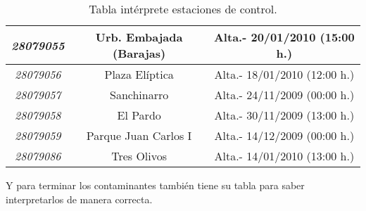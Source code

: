 \begin{table}[H]
\begin{center}
\begin{tabular}{|c|c|c|}
		\textit{28079055} & Urb. Embajada (Barajas) & Alta.- 20/01/2010 (15:00 h.)                                                                     \\ \hline
		\textit{28079056} & Plaza Elíptica          & Alta.- 18/01/2010 (12:00 h.)                                                                     \\ \hline
		\textit{28079057} & Sanchinarro             & Alta.- 24/11/2009 (00:00 h.)                                                                     \\ \hline
		\textit{28079058} & El Pardo                & Alta.- 30/11/2009 (13:00 h.)                                                                     \\ \hline
		\textit{28079059} & Parque Juan Carlos I    & Alta.- 14/12/2009 (00:00 h.)                                                                     \\ \hline
		\textit{28079086} & Tres Olivos    & Alta.- 14/01/2010 (13:00 h.)                                                                    \\ \hline
	
\end{tabular}
	\caption{Tabla intérprete estaciones de control.}
	\end{center}	
\end{table}

Y para terminar los contaminantes también tiene su tabla para saber interpretarlos de manera correcta.

